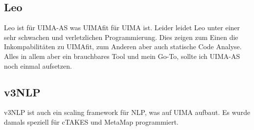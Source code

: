 \subsection{Leo}
Leo ist für UIMA-AS was UIMAfit für UIMA ist. Leider leidet Leo unter einer sehr schwachen und verletzlichen Programmierung. Dies zeigen zum Einen die Inkompabilitäten zu UIMAfit, zum Anderen aber auch statische Code Analyse. Alles in allem aber ein brauchbares Tool und mein Go-To, sollte ich UIMA-AS noch einmal aufsetzen.

\subsection{v3NLP}
v3NLP ist auch ein scaling framework für NLP, was auf UIMA aufbaut. Es wurde damals speziell für cTAKES und MetaMap programmiert.



% 
% 
% 
